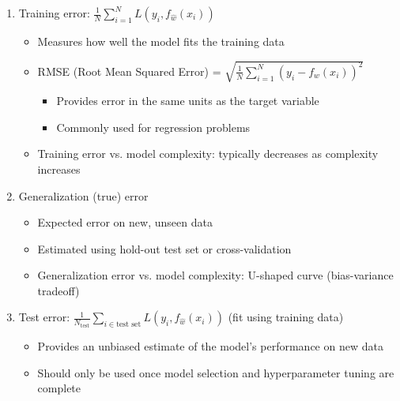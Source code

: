 \documentclass{article}
\begin{document}
\begin{enumerate}
    \item Training error: $\frac{1}{N} \sum_{i=1}^N L(y_i, f_{\hat{w}}(x_i))$
    \begin{itemize}
        \item Measures how well the model fits the training data
        \item RMSE (Root Mean Squared Error) = $\sqrt{\frac{1}{N} \sum_{i=1}^N (y_i - f_w(x_i))^2}$
            \begin{itemize}
                \item Provides error in the same units as the target variable
                \item Commonly used for regression problems
            \end{itemize}
        \item Training error vs. model complexity: typically decreases as complexity increases
    \end{itemize}
    
    \item Generalization (true) error
    \begin{itemize}
        \item Expected error on new, unseen data
        \item Estimated using hold-out test set or cross-validation
        \item Generalization error vs. model complexity: U-shaped curve (bias-variance tradeoff)
    \end{itemize}
    
    \item Test error: $\frac{1}{N_{\text{test}}} \sum_{i \in \text{test set}} L(y_i, f_{\hat{w}}(x_i))$ (fit using training data)
    \begin{itemize}
        \item Provides an unbiased estimate of the model's performance on new data
        \item Should only be used once model selection and hyperparameter tuning are complete
    \end{itemize}
    

\end{enumerate}
\end{document}
